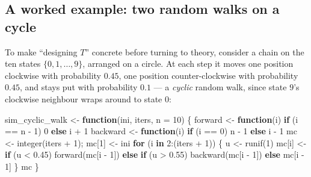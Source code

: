 \documentclass[
  letterpaper,
  DIV=11,
  numbers=noendperiod]{scrreprt}
\newenvironment{Shaded}{\begin{snugshade}}{\end{snugshade}}
\newcommand{\AttributeTok}[1]{\textcolor[rgb]{0.40,0.45,0.13}{#1}}
\newcommand{\ControlFlowTok}[1]{\textcolor[rgb]{0.00,0.23,0.31}{\textbf{#1}}}
\newcommand{\DecValTok}[1]{\textcolor[rgb]{0.68,0.00,0.00}{#1}}
\newcommand{\FloatTok}[1]{\textcolor[rgb]{0.68,0.00,0.00}{#1}}
\newcommand{\FunctionTok}[1]{\textcolor[rgb]{0.28,0.35,0.67}{#1}}
\newcommand{\NormalTok}[1]{\textcolor[rgb]{0.00,0.23,0.31}{#1}}
\newcommand{\OtherTok}[1]{\textcolor[rgb]{0.00,0.23,0.31}{#1}}
\newcommand{\SpecialCharTok}[1]{\textcolor[rgb]{0.37,0.37,0.37}{#1}}
\begin{document}
\subsection{A worked example: two random walks on a
cycle}\label{a-worked-example-two-random-walks-on-a-cycle}

To make ``designing \(T\)'' concrete before turning to theory, consider
a chain on the ten states \(\{0, 1, \ldots, 9\}\), arranged on a circle.
At each step it moves one position clockwise with probability \(0.45\),
one position counter-clockwise with probability \(0.45\), and stays put
with probability \(0.1\) --- a \emph{cyclic} random walk, since state
\(9\)'s clockwise neighbour wraps around to state \(0\):

\begin{Shaded}
\begin{Highlighting}[]
\NormalTok{sim\_cyclic\_walk }\OtherTok{\textless{}{-}} \ControlFlowTok{function}\NormalTok{(ini, iters, }\AttributeTok{n =} \DecValTok{10}\NormalTok{) \{}
\NormalTok{    forward  }\OtherTok{\textless{}{-}} \ControlFlowTok{function}\NormalTok{(i) }\ControlFlowTok{if}\NormalTok{ (i }\SpecialCharTok{==}\NormalTok{ n }\SpecialCharTok{{-}} \DecValTok{1}\NormalTok{) }\DecValTok{0} \ControlFlowTok{else}\NormalTok{ i }\SpecialCharTok{+} \DecValTok{1}
\NormalTok{    backward }\OtherTok{\textless{}{-}} \ControlFlowTok{function}\NormalTok{(i) }\ControlFlowTok{if}\NormalTok{ (i }\SpecialCharTok{==} \DecValTok{0}\NormalTok{) n }\SpecialCharTok{{-}} \DecValTok{1} \ControlFlowTok{else}\NormalTok{ i }\SpecialCharTok{{-}} \DecValTok{1}
\NormalTok{    mc }\OtherTok{\textless{}{-}} \FunctionTok{integer}\NormalTok{(iters }\SpecialCharTok{+} \DecValTok{1}\NormalTok{); mc[}\DecValTok{1}\NormalTok{] }\OtherTok{\textless{}{-}}\NormalTok{ ini}
    \ControlFlowTok{for}\NormalTok{ (i }\ControlFlowTok{in} \DecValTok{2}\SpecialCharTok{:}\NormalTok{(iters }\SpecialCharTok{+} \DecValTok{1}\NormalTok{)) \{}
\NormalTok{        u }\OtherTok{\textless{}{-}} \FunctionTok{runif}\NormalTok{(}\DecValTok{1}\NormalTok{)}
\NormalTok{        mc[i] }\OtherTok{\textless{}{-}} \ControlFlowTok{if}\NormalTok{ (u }\SpecialCharTok{\textless{}} \FloatTok{0.45}\NormalTok{) }\FunctionTok{forward}\NormalTok{(mc[i }\SpecialCharTok{{-}} \DecValTok{1}\NormalTok{])}
                 \ControlFlowTok{else} \ControlFlowTok{if}\NormalTok{ (u }\SpecialCharTok{\textgreater{}} \FloatTok{0.55}\NormalTok{) }\FunctionTok{backward}\NormalTok{(mc[i }\SpecialCharTok{{-}} \DecValTok{1}\NormalTok{])}
                 \ControlFlowTok{else}\NormalTok{ mc[i }\SpecialCharTok{{-}} \DecValTok{1}\NormalTok{]}
\NormalTok{    \}}
\NormalTok{    mc}
\NormalTok{\}}
\end{Highlighting}
\end{Shaded}
\end{document}
